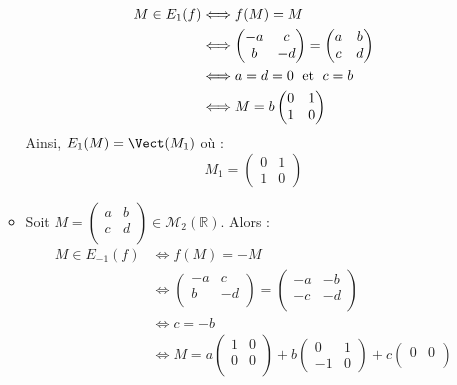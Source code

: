 \documentclass[a4paper,twoside,french,10pt]{VcCours}
\begin{document}
\begin{enumerate}
\begin{itemize}
\begin{align*}
M \in E_1(f) & \Longleftrightarrow f(M)=M \\
& \Longleftrightarrow \begin{pmatrix}
-a&c \\
b & -d \\
\end{pmatrix} = \begin{pmatrix}
a&b \\
c & d \\
\end{pmatrix} \\
& \Longleftrightarrow a=d=0 \; \hbox{ et } \; c=b \\
& \Longleftrightarrow M= b \begin{pmatrix}
0 & 1 \\
1 & 0
\end{pmatrix} 
\end{align*}
Ainsi, $E_1(M) = \Vect(M_1)$ où :
$$ M_1 = \begin{pmatrix}
0 & 1 \\
1 & 0
\end{pmatrix}$$
\item Soit $M= \begin{pmatrix}
a&b \\
c & d \\
\end{pmatrix} \in \mathcal{M}_2(\mathbb{R})$. Alors :
\begin{align*}
M \in E_{-1}(f) & \Longleftrightarrow f(M)=-M \\
& \Longleftrightarrow \begin{pmatrix}
-a&c \\
b & -d \\
\end{pmatrix} = \begin{pmatrix}
-a&-b \\
-c & -d \\
\end{pmatrix} \\
& \Longleftrightarrow c=-b\\
& \Longleftrightarrow M=a \begin{pmatrix} 1 & 0 \\
0 & 0 \\ 
\end{pmatrix} + b \begin{pmatrix}
0 & 1 \\
-1 & 0
\end{pmatrix} + c \begin{pmatrix} 0 & 0 \\

\end{pmatrix}
\end{align*}
\end{itemize}
\end{enumerate}
\end{document}
